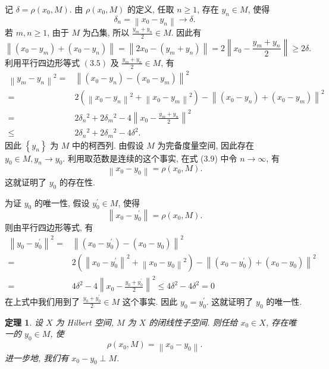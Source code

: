 \documentclass[openany]{ctexbook}
\makeatletter
\theoremstyle{kaiti}
\newtheorem{theorem}{定理}[section]
\theoremstyle{normal}
\renewenvironment{proof}[1][\proofname]{\par
    \pushQED{\qed}%
    \normalfont \topsep6\p@\@plus6\p@\relax
    \trivlist
    \item\relax
    {\heiti #1}\hspace{2\labelsep}\ignorespaces
  }{%
    \popQED\endtrivlist\@endpefalse
  }
\makeatother
\begin{document}
\begin{proof}
记 $\delta=\rho\left(x_0, M\right)$. 由 $\rho\left(x_0, M\right)$ 的定义, 任取 $n \geqslant 1$, 存在 $y_n \in M$, 使得
\begin{equation}
  \delta_n=\left\|x_0-y_n\right\| \rightarrow \delta.
\end{equation}
若 $m, n \geqslant 1$, 由于 $M$ 为凸集, 所以 $\frac{y_m+y_n}{2} \in M$. 因此有
$$
\left\|\left(x_0-y_m\right)+\left(x_0-y_n\right)\right\|=\left\|2 x_0-\left(y_m+y_n\right)\right\|=2\left\|x_0-\frac{y_m+y_n}{2}\right\| \geqslant 2 \delta.
$$
利用平行四边形等式 $(3.5)$ 及 $\frac{y_m+y_n}{2} \in M$, 有
$$
  \begin{aligned}
    \left\|y_m-y_n\right\|^2=&\left\|\left(x_0-y_n\right)-\left(x_0-y_m\right)\right\|^2 \\
    =& 2\left(\left\|x_0-y_n\right\|^2+\left\|x_0-y_m\right\|^2\right) -\left\|\left(x_0-y_n\right)+\left(x_0-y_m\right)\right\|^2 \\
    =& 2 \delta_n{ }^2+2 \delta_m{ }^2-4\left\|x_0-\frac{y_m+y_n}{2}\right\|^2 \\
    \leqslant & 2 \delta_n{ }^2+2 \delta_m{ }^2-4 \delta^2.
  \end{aligned}
$$
因此 $\left\{y_n\right\}$ 为 $M$ 中的柯西列. 由假设 $M$ 为完备度量空间, 因此存在 $y_0 \in M, y_n \rightarrow y_0$. 利用取范数是连续的这个事实, 在式 (3.9) 中令 $n \rightarrow \infty$, 有
$$
\left\|x_0-y_0\right\|=\rho\left(x_0, M\right).
$$
这就证明了 $y_0$ 的存在性.

为证 $y_0$ 的唯一性, 假设 $y_0^{\prime} \in M$, 使得
$$
\left\|x_0-y_0^{\prime}\right\|=\rho\left(x_0, M\right).
$$
则由平行四边形等式, 有
$$
  \begin{aligned}
    \left\|y_0-y_0^{\prime}\right\|^2=&\left\|\left(x_0-y_0^{\prime}\right)-\left(x_0-y_0\right)\right\|^2 \\
    =& 2\left(\left\|x_0-y_0^{\prime}\right\|^2+\left\|x_0-y_0\right\|^2\right) -\left\|\left(x_0-y_0^{\prime}\right)+\left(x_0-y_0\right)\right\|^2 \\
    =& 4 \delta^2-4\left\|x_0-\frac{y_0+y_0^{\prime}}{2}\right\|^2 \leqslant 4 \delta^2-4 \delta^2=0
  \end{aligned}
$$
在上式中我们用到了 $\frac{y_0+y_0^{\prime}}{2} \in M$ 这个事实. 因此 $y_0=y_0^{\prime}$. 这就证明了 $y_0$ 的唯一性.
\end{proof}

\begin{theorem}
设 $X$ 为 Hilbert 空间, $M$ 为 $X$ 的闭线性子空间. 则任给 $x_0 \in X$, 存在唯一的 $y_0 \in M$, 使
$$
\rho\left(x_0, M\right)=\left\|x_0-y_0\right\|.
$$
进一步地, 我们有 $x_0-y_0 \perp M$.
\end{theorem}
\end{document}
